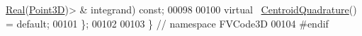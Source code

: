 \begin{DoxyCode}
      \hyperlink{namespaceFVCode3D_a40c1f5588a248569d80aa5f867080e83}{Real}(\hyperlink{classFVCode3D_1_1Point3D}{Point3D})> & integrand) \textcolor{keyword}{const};
00098 
00100     \textcolor{keyword}{virtual} ~\hyperlink{classFVCode3D_1_1CentroidQuadrature}{CentroidQuadrature}() = \textcolor{keywordflow}{default};
00101 \};
00102 
00103 \} \textcolor{comment}{// namespace FVCode3D}
00104 \textcolor{preprocessor}{#endif}
\end{DoxyCode}
